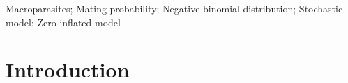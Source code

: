 \documentclass[useAMS,referee,usenatbib]{biom}
\begin{document}
%

\begin{keywords}
Macroparasites; Mating probability; Negative binomial distribution; Stochastic model; Zero-inflated model
\end{keywords}


\maketitle


%

\section{Introduction}
\label{s:intro}
\end{document}
